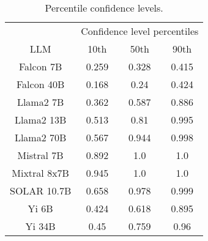 \begin{table*}
\centering
\begin{tabular}{c|c|c|c}
& \multicolumn{3}{c}{Confidence level percentiles} \\ 
LLM & 10th & 50th & 90th\\ \hline
Falcon 7B & 0.259 & 0.328 & 0.415\\
Falcon 40B & 0.168 & 0.24 & 0.424\\
Llama2 7B & 0.362 & 0.587 & 0.886\\
Llama2 13B & 0.513 & 0.81 & 0.995\\
Llama2 70B & 0.567 & 0.944 & 0.998\\
Mistral 7B & 0.892 & 1.0 & 1.0\\
Mixtral 8x7B & 0.945 & 1.0 & 1.0\\
SOLAR 10.7B & 0.658 & 0.978 & 0.999\\
Yi 6B & 0.424 & 0.618 & 0.895\\
Yi 34B & 0.45 & 0.759 & 0.96\\
\hline
\end{tabular}
\caption{Percentile confidence levels.}
\label{tab:percentile_conf}
\end{table*}
